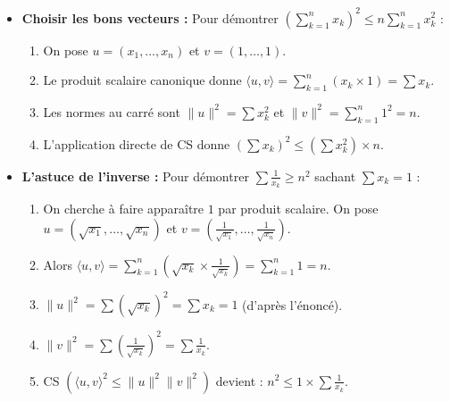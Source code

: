 \documentclass[french]{yLectureNote}
\begin{document}
\begin{itemize}
    \item \textbf{Choisir les bons vecteurs :} 
    Pour démontrer $\left(\sum_{k=1}^n x_k\right)^2 \leq n \sum_{k=1}^n x_k^2$ :
    \begin{enumerate}
        \item On pose $u = (x_1, \dots, x_n)$ et $v = (1, \dots, 1)$.
        \item Le produit scalaire canonique donne $\langle u, v \rangle = \sum_{k=1}^n (x_k \times 1) = \sum x_k$.
        \item Les normes au carré sont $\|u\|^2 = \sum x_k^2$ et $\|v\|^2 = \sum_{k=1}^n 1^2 = n$.
        \item L'application directe de CS donne $(\sum x_k)^2 \leq (\sum x_k^2) \times n$.
    \end{enumerate}

    \item \textbf{L'astuce de l'inverse :} 
    Pour démontrer $\sum \frac{1}{x_k} \geq n^2$ sachant $\sum x_k = 1$ :
    \begin{enumerate}
        \item On cherche à faire apparaître $1$ par produit scalaire. On pose $u = (\sqrt{x_1}, \dots, \sqrt{x_n})$ et $v = (\frac{1}{\sqrt{x_1}}, \dots, \frac{1}{\sqrt{x_n}})$.
        \item Alors $\langle u, v \rangle = \sum_{k=1}^n (\sqrt{x_k} \times \frac{1}{\sqrt{x_k}}) = \sum_{k=1}^n 1 = n$.
        \item $\|u\|^2 = \sum (\sqrt{x_k})^2 = \sum x_k = 1$ (d'après l'énoncé).
        \item $\|v\|^2 = \sum (\frac{1}{\sqrt{x_k}})^2 = \sum \frac{1}{x_k}$.
        \item CS $(\langle u, v \rangle^2 \leq \|u\|^2 \|v\|^2)$ devient : $n^2 \leq 1 \times \sum \frac{1}{x_k}$.
    \end{enumerate}

\end{itemize}
\end{document}
